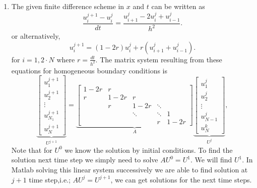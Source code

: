\begin{solution}
 \begin{enumerate}

\item The given finite difference scheme in $x$ and $t$ can be written as
\[
\frac{u^{j+1}_i - u^j_i}{dt} = \frac{u_{i+1}^j - 2u_i^j + u_{i-1}^j}{h^2}.
\]
 or alternatively,
 \[
u^{j+1}_i = (1-2r) u_{i}^j + r(u_{i+1}^j + u_{i-1}^j).
\]
for $i=1,2 \cdot N$ where $r=\frac{dt}{h^2}$. The matrix system resulting from these equations for homogeneous boundary conditions is
\[
 \underbrace{\left[\begin{array}{c} u_1^{j+1} \\[0.25em] u_2^{j+1} \\[0.25em] \vdots \\[0.25em] u_{N_1}^{j+1} \\[0.25em] u_N^{j+1} \end{array}\right]}_{U^{j+1}}
 =\underbrace{\left[\begin{array}{rrrrr}
              1-2r & r \\[0.25em]
               r & 1-2r & r \\
                 &  r  & 1-2r & \ddots \\
                 & & \ddots & \ddots & 1 \\[0.25em]
                 & & & r & 1-2r 
               \end{array}\right]}_{A}
          \underbrace{\left[\begin{array}{c} u_1^{j} \\[0.25em] u_2^{j}  \\[0.25em] \vdots \\[0.25em] u_{N-1}^{j}  \\[0.25em] u_N^k\end{array}\right]}_{U^j},
\]
Note that for $U^0$ we know the solution by initial conditions. To find the solution next time step we simply need to solve $A U^0 = U^{1}$. We will find $U^1$. In Matlab solving this linear system successively we are able to find solution at $j+1$ time step,i.e.;  $A U^j = U^{j+1}$, we can get solutions for the next time steps.


\end{enumerate}
\end{solution}
